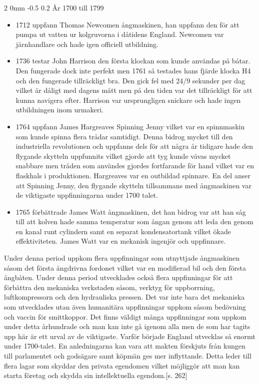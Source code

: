 \documentclass[a4paper,12pt]{article}
\makeatletter
\renewcommand{\subsection}{\@startsection
   {subsection}%
   {2}%
   {0mm}%
   {-0.5\baselineskip}%
   {0.2\baselineskip}%
   {\rmfamily\normalfont\slshape\normalsize}}%
\makeatother
\begin{document}
\subsection{År 1700 till 1799}
\begin{itemize}
\item 1712 uppfann Thomas Newcomen ångmaskinen, han uppfann den för att pumpa ut vatten ur kolgruvorna i dåtidens England.\cite{steam} Newcomen var järnhandlare och hade igen officiell utbildning.\cite{newcomen-life}

\item 1736 testar John Harrison den första klockan som kunde användas på båtar. Den fungerade dock inte perfekt men 1761 så testades hans fjärde klocka H4 och den fungerade tillräckligt bra. Den gick fel med 24/9 sekunder per dag vilket är dåligt med dagens mått men på den tiden var det tillräckligt för att kunna navigera efter. Harrison var ursprungligen snickare och hade ingen utbildningen inom urmakeri.\cite{harrison}

\item 1764 uppfann James Hargreaves Spinning Jenny vilket var en spinnmaskin som kunde spinna flera trådar samtidigt. Denna bidrog mycket till den industriella revolutionen och uppfanns dels för att några år tidigare hade den flygande skytteln uppfunnits vilket gjorde att tyg kunde vävas mycket snabbare men tråden som användes gjordes fortfarande för hand vilket var en flaskhals i produktionen.\cite{jenny}  Hargreaves var en outbildad spinnare.\cite{hargreaves-life} En del anser att Spinning Jenny, den flygande skytteln tillsammans med ångmaskinen var de viktigaste uppfinningarna under 1700 talet.\cite{haikola}

\item 1765 förbättrade James Watt ångmaskinen, det han bidrog var att han såg till att kolven hade samma temperatur som ångan genom att leda den genom en kanal runt cylindern samt en separat kondensatortank vilket ökade effektiviteten.\cite{watt} James Watt var en mekanisk ingenjör och uppfinnare.\cite{watt-life}
\end{itemize}
Under denna period uppkom flera uppfinningar som utnyttjade ångmaskinen såsom det första ångdrivna fordonet vilket var en modifierad bil och den första ångbåten.
Under denna period utvecklades också flera uppfinningar för att förbättra den mekaniska verkstaden såsom, verktyg för uppborrning, luftkompressorn och den hydrauliska pressen.
\newline
\newline
 Det var inte bara det mekaniska som utvecklades utan även humanitära uppfinningar uppkom såsom bedövning och vaccin för smittkoppor. Det finns väldigt många uppfinningar som uppkom under detta århundrade och man kan inte gå igenom alla men de som har tagits upp här är ett urval av de viktigaste.
\newline
\newline
Varför började England utvecklas så enormt under 1700-talet. En anledningarna kan vara att makten förskjuts från kungen till parlamentet och godsägare samt köpmän ges mer inflyttande. Detta leder till flera lagar som skyddar den privata egendomen vilket möjliggör att man kan starta företag och skydda sin intellektuella egendom.\cite{hansson}[s. 262]
\end{document}
